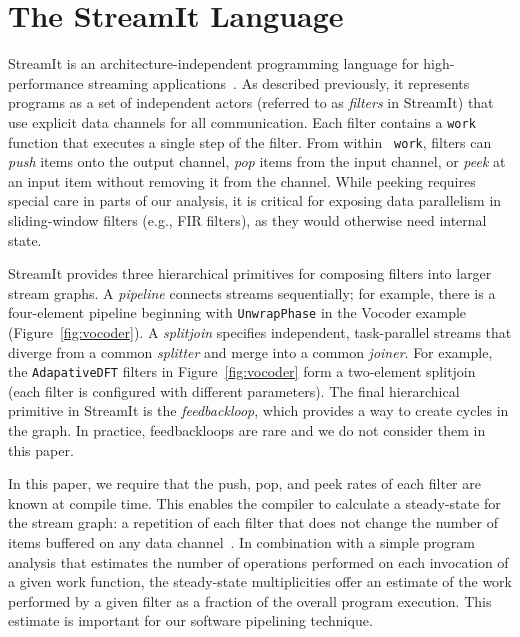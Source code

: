 \section{The StreamIt Language}

StreamIt is an architecture-independent programming language for
high-performance streaming
applications~\cite{streamitcc,streamit-lang-spec}.  As described
previously, it represents programs as a set of independent actors
(referred to as {\it filters} in StreamIt) that use explicit data
channels for all communication.  Each filter contains a {\tt work}
function that executes a single step of the filter.  From within {\tt
work}, filters can {\it push} items onto the output channel, {\it pop}
items from the input channel, or {\it peek} at an input item without
removing it from the channel.  
While peeking requires special care in parts of our analysis, it is
critical for exposing data parallelism in sliding-window filters
(e.g., FIR filters), as they would otherwise need internal state.

StreamIt provides three hierarchical primitives for composing filters
into larger stream graphs.  A {\it pipeline} connects streams
sequentially; for example, there is a four-element pipeline beginning
with {\tt UnwrapPhase} in the Vocoder example
(Figure~\ref{fig:vocoder}).  A {\it splitjoin} specifies independent,
task-parallel streams that diverge from a common {\it splitter} and
merge into a common {\it joiner}.  For example, the {\tt AdapativeDFT}
filters in Figure~\ref{fig:vocoder} form a two-element splitjoin (each
filter is configured with different parameters).  The final
hierarchical primitive in StreamIt is the {\it feedbackloop}, which
provides a way to create cycles in the graph.  In practice,
feedbackloops are rare and we do not consider them in this paper.

In this paper, we require that the push, pop, and peek rates of each
filter are known at compile time.  This enables the compiler to
calculate a steady-state for the stream graph: a repetition of each
filter that does not change the number of items buffered on any data
channel~\cite{lee87,karczmarek:lctes:2003}. In
combination with a simple program analysis that estimates the number
of operations performed on each invocation of a given work function,
the steady-state multiplicities offer an estimate of the work
performed by a given filter as a fraction of the overall program
execution.  This estimate is important for our software pipelining
technique.
